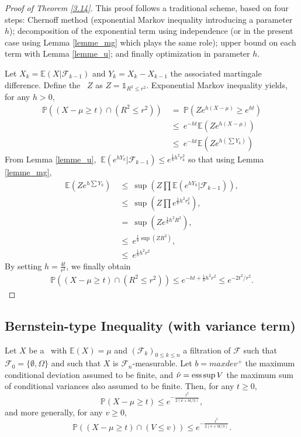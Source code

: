 \begin{proof}[Proof of Theorem \ref{3.14}]
This proof follows a traditional scheme, based on four steps: Chernoff method (exponential Markov inequality introducing a parameter $h$); decomposition of the exponential term using independence (or in the present case using Lemma \ref{lemme_mg} which plays the same role); upper bound on each term with Lemma \ref{lemme_u}; and finally optimization in parameter $h$.

Let $X_k=\mathbb{E}(X|\mathcal{F}_{k-1})$ and $Y_k=X_k-X_{k-1}$ the associated martingale difference.
Define the \rv~$Z$ as $Z=\mathds{1}_{R^2 \leq r^2}$. Exponential Markov inequality yields, for any $h>0$,
\begin{align*}
\mathbb{P}((X-\mu \geq t)\cap(R^2 \leq r^2)) 
 &~=~ \mathbb{P}(Ze^{h(X-\mu)} \geq e^{ht})\\
 &~\leq~ e^{-ht}\mathbb{E}(Ze^{h(X-\mu)})\\
 &~\leq~ e^{-ht}\mathbb{E}(Ze^{h(\sum Y_k)}) 
 \end{align*}
From Lemma \ref{lemme_u}, $~\mathbb{E}(e^{hY_k}|\mathcal{F}_{k-1}) \leq e^{\frac{1}{8}h^2r_k^2}$ so that using Lemma \ref{lemme_mg},
\begin{align*}
 \mathbb{E}(Ze^{h\sum Y_k}) &~\leq~ \sup(Z \prod \mathbb{E}(e^{hY_k}|\mathcal{F}_{k-1})),\\
&~\leq~  \sup(Z \prod e^{\frac{1}{8}h^2 r_k^2}),\\
&~=~ \sup(Z e^{\frac{1}{8}h^2R^2}),\\
&~\leq~ e^{\frac{1}{8}\sup(ZR^2)},\\
&~\leq~ e^{\frac{1}{8}h^2r^2}
\end{align*}
By setting $h=\frac{4t}{r^2}$, we finally obtain
\begin{align*}
\mathbb{P}((X-\mu \geq t)\cap(R^2 \leq r^2)) \leq e^{-ht+\frac{1}{8}h^2r^2} \leq e^{-2t^2/r^2}.
\end{align*} 

\end{proof}


\subsection{Bernstein-type Inequality (with variance term)}
\begin{theorem} \citep{McDiarmid98}
\label{3.15}
Let $X$ be a \rv~with $\mathbb{E}(X)=\mu$ and $(\mathcal{F}_k)_{0\leq k \leq n}$ a filtration of $\mathcal{F}$ such that $ \mathcal{F}_0 =  \{\emptyset , \Omega\} $ and such that $X$ is $\mathcal{F}_n$-measurable.
Let $b=maxdev^+$ the maximum conditional deviation assumed to be finite, and $\hat\nu=\supess V$ the maximum sum of conditional variances also assumed to be finite.
Then, for any  $t \geq 0$, $$\mathbb{P}(X-\mu \geq t) \leq e^{-\frac{t^2}{2(\hat\nu+bt/3)}},$$
and more generally, for any $v \geq 0$,~ $$\mathbb{P}((X-\mu \geq t)\cap(V \leq v)) \leq e^{-\frac{t^2}{2(v+bt/3)}}.$$
\end{theorem}

